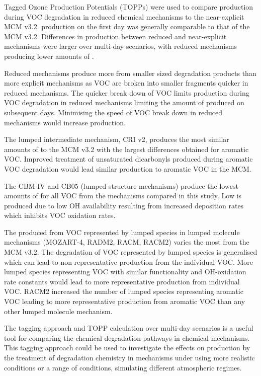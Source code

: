 Tagged Ozone Production Potentials (TOPPs) were used to compare  production during VOC degradation in reduced chemical mechanisms to the near-explicit MCM v3.2. 
 production on the first day was generally comparable to that of the MCM v3.2.
Differences in  production between reduced and near-explicit mechanisms were larger over multi-day scenarios, with reduced mechanisms producing lower amounts of .

Reduced mechanisms produce more  from smaller sized degradation products than more explicit mechanisms as VOC are broken into smaller fragments quicker in reduced mechanisms.
The quicker break down of VOC limits  production during VOC degradation in reduced mechanisms limiting the amount of  produced on subsequent days.
Minimising the speed of VOC break down in reduced mechanisms would increase  production.

The lumped intermediate mechanism, CRI v2, produces the most similar amounts of  to the MCM v3.2 with the largest differences obtained for aromatic VOC.
Improved treatment of unsaturated dicarbonyls produced during aromatic VOC degradation would lead similar  production to aromatic VOC in the MCM.

The CBM-IV and CB05 (lumped structure mechanisms) produce the lowest amounts of  for all VOC from the mechanisms compared in this study.
Low  is produced due to low OH availability resulting from increased  deposition rates which inhibits VOC oxidation rates.

The  produced from VOC represented by lumped species in lumped molecule mechanisms (MOZART-4, RADM2, RACM, RACM2) varies the most from the MCM v3.2.
The degradation of VOC represented by lumped species is generalised which can lead to non-representative  production from the individual VOC.
More lumped species representing VOC with similar functionality and OH-oxidation rate constants would lead to more representative  production from individual VOC.
RACM2 increased the number of lumped species representing aromatic VOC leading to more representative  production from aromatic VOC than any other lumped molecule mechanism.

The tagging approach and TOPP calculation over multi-day scenarios is a useful tool for comparing the chemical degradation pathways in chemical mechanisms. 
This tagging approach could be used to investigate the effects on  production by the treatment of degradation chemistry in mechanisms under using more realistic  conditions or a range of  conditions, simulating different atmospheric regimes. 
